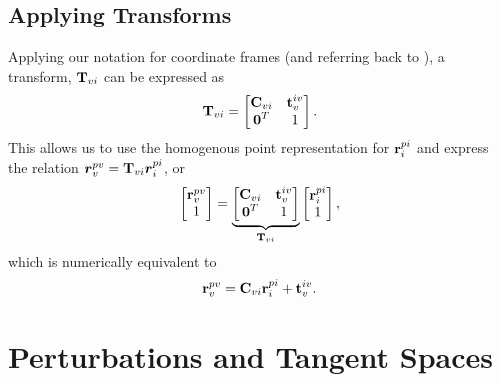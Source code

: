 \subsection{Applying Transforms}
Applying our notation for coordinate frames (and referring back to ), a transform, $\boldsymbol{\mathbf{T}}_{vi}$ can be expressed as 
\begin{equation}
\boldsymbol{\mathbf{T}}_{vi} = \begin{bmatrix} \boldsymbol{\mathbf{C}}_{vi} & \boldsymbol{\mathbf{t}}_v^{iv} \\ \boldsymbol{\mathbf{0}}^T & 1 \end{bmatrix}.
\end{equation}
This allows us to use the homogenous point representation for $\boldsymbol{\mathbf{r}}^{pi}_i$ and express the relation $\boldsymbol{r}^{pv}_v = \boldsymbol{\mathbf{T}}_{vi} \boldsymbol{r}^{pi}_i$, or
\begin{equation}
	\begin{bmatrix} \boldsymbol{\mathbf{r}}^{pv}_v \\ 1 \end{bmatrix} = \underbrace{\begin{bmatrix} \boldsymbol{\mathbf{C}}_{vi} & \boldsymbol{\mathbf{t}}_v^{iv} \\ \boldsymbol{\mathbf{0}}^T & 1 \end{bmatrix}}_{\boldsymbol{\mathbf{T}}_{vi}} \begin{bmatrix} \boldsymbol{\mathbf{r}}^{pi}_i \\ 1 \end{bmatrix},
\end{equation}
which is numerically equivalent to  
\begin{equation}
 \boldsymbol{\mathbf{r}}^{pv}_v =  \boldsymbol{\mathbf{C}}_{vi} \boldsymbol{\mathbf{r}}^{pi}_i + \boldsymbol{\mathbf{t}}_v^{iv}.  
 \end{equation}

\section{Perturbations and Tangent Spaces}
\label{sec:math_perturbations}

